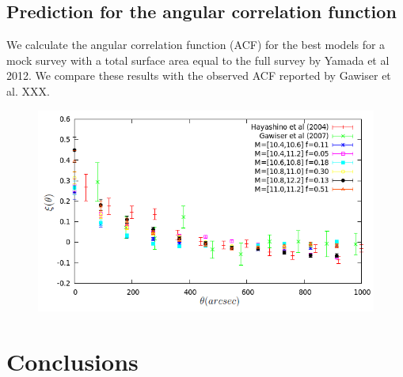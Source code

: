 \documentclass{emulateapj}
\begin{document}
\subsection{Prediction for the angular correlation function}

We calculate the angular correlation function (ACF) for the best models for a mock survey with a total surface area equal to the full survey by Yamada et al 2012. We compare these results with the observed ACF reported by Gawiser et al. XXX. 

\begin{figure}
\begin{center}
\includegraphics[width=1.00\linewidth,angle=0]{./plots/correlation_best_models_with_obs_comp.png}
\end{center} 
\caption{ \label{figure:landscape} 
}
\end{figure}

% 

\section{Conclusions}
\end{document}
